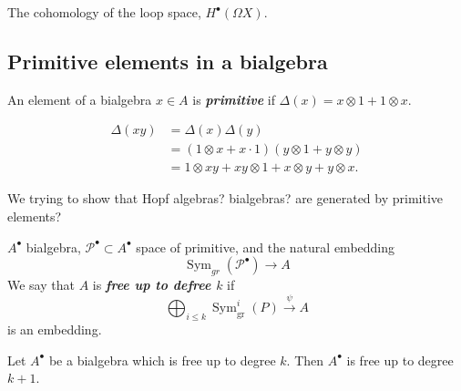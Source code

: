 \begin{example}
	The cohomology of the loop space, $H^{\bullet}(\Omega X)$.
\end{example}

\subsection{Primitive elements in a bialgebra}

\begin{defn}
	An element of a bialgebra $x\in A$ is \textit{\textbf{primitive}} if $\Delta(x)=x\otimes 1+1\otimes x$.
\end{defn}

\begin{align*}
	\Delta(xy)&=\Delta(x)\Delta(y)\\
	&=(1\otimes x+x\cdot 1)(y\otimes 1+y\otimes y)\\
	&=1\otimes xy+xy\otimes 1+x\otimes y+y\otimes x.
\end{align*}

\begin{remark}
	We trying to show that Hopf algebras? bialgebras? are generated by primitive elements?
\end{remark}

\begin{defn}
	$A^\bullet$ bialgebra, $\mathcal{P}^\bullet\subset A^\bullet$ space of primitive, and the natural embedding
	\[\operatorname{Sym}_{gr}(\mathcal{P}^\bullet)\to A\]
	We say that $A$ is \textit{\textbf{free up to defree $k$}} if
	\[\bigoplus_{i\leq k} \operatorname{Sym}_{\operatorname{gr}}^i(P)\overset{\psi}{\longrightarrow} A\]
	is an embedding.
\end{defn}

\begin{lemma}
	Let $A^\bullet$ be a bialgebra which is free up to degree $k$. Then $A^\bullet$ is free up to degree $k+1$.
\end{lemma}

